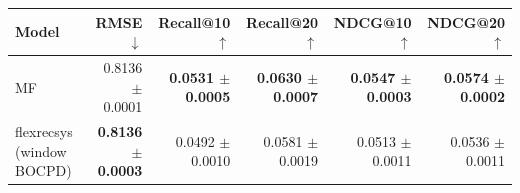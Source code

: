 \begin{tabular}{lrrrrr}
\toprule
Model & RMSE $\downarrow$ & Recall@10 $\uparrow$ & Recall@20 $\uparrow$ & NDCG@10 $\uparrow$ & NDCG@20 $\uparrow$ \\
\midrule
MF & 0.8136 $\pm$ 0.0001 & \textbf{0.0531 $\pm$ 0.0005} & \textbf{0.0630 $\pm$ 0.0007} & \textbf{0.0547 $\pm$ 0.0003} & \textbf{0.0574 $\pm$ 0.0002} \\
flexrecsys (window BOCPD) & \textbf{0.8136 $\pm$ 0.0003} & 0.0492 $\pm$ 0.0010 & 0.0581 $\pm$ 0.0019 & 0.0513 $\pm$ 0.0011 & 0.0536 $\pm$ 0.0011 \\
\bottomrule
\end{tabular}
